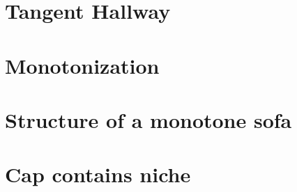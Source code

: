 
\section{Tangent Hallway}
\label{sec:tangent-hallway}


\section{Monotonization}
\label{sec:monotonization}


\section{Structure of a monotone sofa}
\label{sec:structure-of-a-monotone-sofa}


\section{Cap contains niche}
\label{sec:cap-contains-niche}


